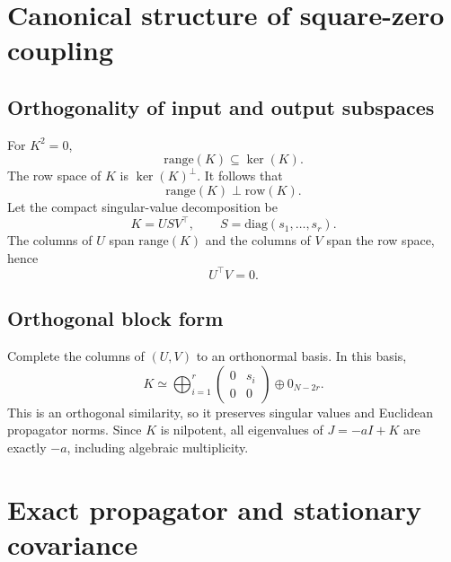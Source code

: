 \documentclass[
  aps,prl,preprint,notitlepage,superscriptaddress,nofootinbib,longbibliography,
  amsmath,amssymb
]{revtex4-2}
\begin{document}
\section{Canonical structure of square-zero coupling}
\label{sec:s-structure}

\subsection{Orthogonality of input and output subspaces}

For $K^2=0$,
\begin{equation}
\mathrm{range}(K)\subseteq\ker(K).
\end{equation}
The row space of $K$ is $\ker(K)^\perp$. It follows that
\begin{equation}
\mathrm{range}(K)\perp\mathrm{row}(K).
\end{equation}
Let the compact singular-value decomposition be
\begin{equation}
K=USV^\top,\qquad
S=\mathrm{diag}(s_1,\ldots,s_r).
\end{equation}
The columns of $U$ span $\mathrm{range}(K)$ and the columns of $V$ span the
row space, hence
\begin{equation}
U^\top V=0.
\label{eq:s-uvorth}
\end{equation}

\subsection{Orthogonal block form}

Complete the columns of $(U,V)$ to an orthonormal basis. In this basis,
\begin{equation}
K\simeq
\bigoplus_{i=1}^r
\begin{pmatrix}
0&s_i\\
0&0
\end{pmatrix}
\oplus 0_{N-2r}.
\label{eq:s-blockform}
\end{equation}
This is an orthogonal similarity, so it preserves singular values and
Euclidean propagator norms. Since $K$ is nilpotent, all eigenvalues of
$J=-aI+K$ are exactly $-a$, including algebraic multiplicity.

\section{Exact propagator and stationary covariance}
\label{sec:s-exact}
\end{document}

